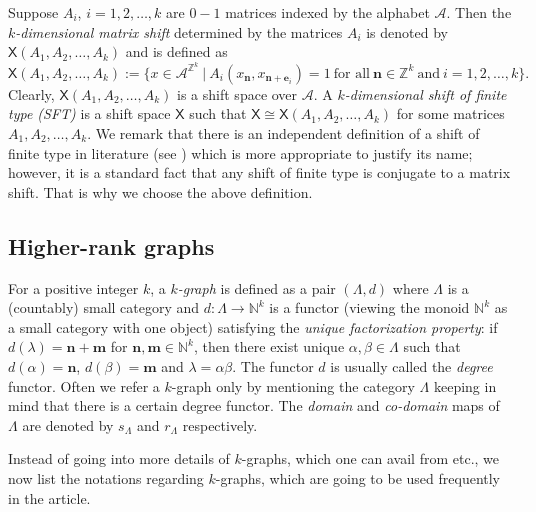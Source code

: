 \documentclass[a4paper,reqno,12pt]{amsart}
\newcommand{\N}{\mathbf{n}}
\newcommand{\M}{\mathbf{m}}
\newcommand{\Xs}{\mathsf{X}}
\theoremstyle{definition}
\theoremstyle{remark}
\begin{document}
Suppose $A_i$, $i=1,2,\ldots,k$ are $0-1$ matrices indexed by the alphabet $\mathcal{A}$. Then the \emph{$k$-dimensional matrix shift} determined by the matrices $A_i$ is denoted by $\Xs(A_1,A_2,\ldots,A_k)$ and is defined as \[\Xs(A_1,A_2,\ldots,A_k):=\{x\in \mathcal{A}^{\mathbb{Z}^k}~|~A_i(x_\N,x_{\N+\mathbf{e}_i})=1~\text{for all}~\N\in \mathbb{Z}^k~\text{and}~i=1,2,\ldots,k\}.\] Clearly, $\Xs(A_1,A_2,\ldots,A_k)$ is a shift space over $\mathcal{A}$. A \emph{$k$-dimensional shift of finite type (SFT)} is a shift space $\Xs$ such that $\Xs\cong \Xs(A_1,A_2,\ldots,A_k)$ for some matrices $A_1,A_2,\ldots,A_k$. We remark that there is an independent definition of a shift of finite type in literature (see \cite{BGGLPP,Lind-Marcus,Quas-Trow}) which is more appropriate to justify its name; however, it is a standard fact that any shift of finite type is conjugate to a matrix shift. That is why we choose the above definition.

\subsection{Higher-rank graphs}\label{ssec k-graphs}
For a positive integer $k$, a \emph{$k$-graph} is defined as a pair $(\Lambda,d)$ where $\Lambda$ is a (countably) small category and $d:\Lambda\longrightarrow \mathbb{N}^k$ is a functor (viewing the monoid $\mathbb{N}^k$ as a small category with one object) satisfying the \emph{unique factorization property}: if $d(\lambda)=\N+\M$ for $\N,\M\in \mathbb{N}^k$, then there exist unique $\alpha,\beta\in \Lambda$ such that $d(\alpha)=\N$, $d(\beta)=\M$ and $\lambda=\alpha\beta$. The functor $d$ is usually called the \emph{degree} functor. Often we refer a $k$-graph only by mentioning the category $\Lambda$ keeping in mind that there is a certain degree functor. The \emph{domain} and \emph{co-domain} maps of $\Lambda$ are denoted by $s_\Lambda$ and $r_\Lambda$ respectively. 

Instead of going into more details of $k$-graphs, which one can avail from \cite{Pino,HMPS2,Kumjian-Pask} etc., we now list the notations regarding $k$-graphs, which are going to be used frequently in the article. 
\end{document}
